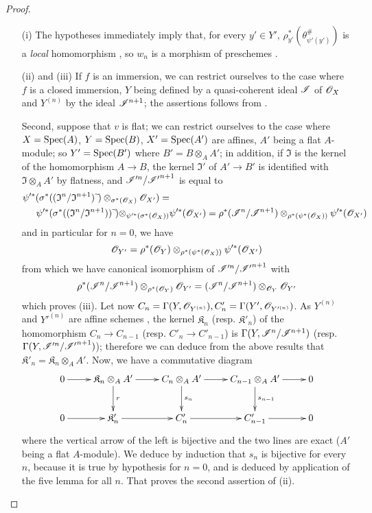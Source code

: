\begin{proof}
\medskip\noindent
\begin{enumerate}
  \item[(i)] The hypotheses immediately imply that, for every $y' \in Y'$, $\rho_{y'}^*(\theta_{\psi'(y')}^\#)$ is a \emph{local} homomorphism , so $w_n$ is a morphism of preschemes .
  \item[(ii) and (iii)] If $f$ is an immersion, we can restrict ourselves to the case where $f$ is a closed immersion, $Y$ being defined by a quasi-coherent ideal $\mathscr{I}$ of $\mathscr{O}_X$ and $Y^{(n)}$ by the ideal $\mathscr{I}^{n+1}$;
  the assertions follows from .

  Second, suppose that $v$ is flat;
  we can restrict ourselves to the case where $X = \operatorname{Spec}(A)$, $Y = \operatorname{Spec}(B)$, $X' = \operatorname{Spec}(A')$ are affines, $A'$ being a flat $A$-module;
  so $Y' = \operatorname{Spec}(B')$ where $B' = B \otimes_A A'$;
  in addition, if $\mathfrak{I}$ is the kernel of the homomorphism $A \to B$, the kernel $\mathfrak{I'}$ of $A' \to B'$ is identified with $\mathfrak{I}\otimes_A A'$ by flatness, and $\mathscr{I}'^n/\mathscr{I'}^{n+1}$ is equal to
  \begin{align*}
    \psi'^*(\sigma^*((\mathfrak{I}^n/\mathfrak{I}^{n+1})\,\widetilde{\,}) \otimes_{\sigma^*(\mathscr{O}_X)} \mathscr{O}_{X'}) =& \\
    \psi'^*(\sigma^*((\mathfrak{I}^n/\mathfrak{I}^{n+1} ))\,\widetilde{\,}) \otimes_{\psi'^*(\sigma^*(\mathscr{O}_X))} &\psi'^*(\mathscr{O}_{X'}) = \rho^*(\mathscr{I}^n/\mathscr{I}^{n+1})\otimes_{\rho^*(\psi^*(\mathscr{O}_X))} \psi'^*(\mathscr{O}_{X'}) 
  \end{align*}
  and in particular for $n = 0$, we have
  \[
    \mathscr{O}_{Y'} = \rho^*(\mathscr{O}_Y) \otimes_{\rho^*(\psi^*(\mathscr{O}_X))} \psi'^*(\mathscr{O}_{X'})
  \]
  from which we have canonical isomorphism of $\mathscr{I}'^n/\mathscr{I'}^{n+1}$ with
  \[
    \rho^*(\mathscr{I}^n/\mathscr{I}^{n+1})\otimes_{\rho^*(\mathscr{O}_Y)} \mathscr{O}_{Y'} = (\mathscr{I}^n/\mathscr{I}^{n+1}) \otimes_{\mathscr{O}_Y} \mathscr{O}_{Y'}
  \]
  which proves (iii).
  Let now $C_n = \Gamma(Y, \mathscr{O}_{Y^{(n)}}), C'_n = \Gamma(Y', \mathscr{O}_{Y'^{(n)}})$.
  As $Y^{(n)}$ and $Y'^{(n)}$ are affine schemes , the kernel $\mathfrak{K}_n$ (resp. $\mathfrak{K}'_n$) of the homomorphism $C_n \to C_{n-1}$ (resp. $C'_n \to C'_{n-1}$) is $\Gamma(Y, \mathscr{I}^n/\mathscr{I}^{n+1})$ (resp. $\Gamma(Y, \mathscr{I}'^n/\mathscr{I'}^{n+1})$);
  therefore we can deduce from the above results that $\mathfrak{K}'_n = \mathfrak{K}_n \otimes_A A'$.
  Now, we have a commutative diagram
  \[
    \xymatrix{
      0 \ar[r] & \mathfrak{K}_n \ar[d]^-r\ar[r] \otimes_A A' & C_n \otimes_A A' \ar[d]^-{s_n}\ar[r] & C_{n-1} \otimes_A A' \ar[d]^-{s_{n-1}}\ar[r] & 0 \\
      0 \ar[r] & \mathfrak{K}'_n \ar[r] & C'_n \ar[r] & C'_{n-1} \ar[r] & 0
    }
  \]
  where the vertical arrow of the left is bijective and the two lines are exact ($A'$ being a flat $A$-module).
  We deduce by induction that $s_n$ is bijective for every $n$, because it is true by hypothesis for $n = 0$, and is deduced by application of the five lemma for all $n$.
  That proves the second assertion of (ii).
\end{enumerate}
\end{proof}

